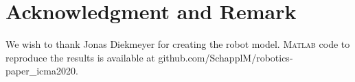 
\section*{Acknowledgment and Remark}


We wish to thank Jonas Diekmeyer for creating the robot model.
%
\textsc{Matlab} code to reproduce the results is available at  
%
github.com/SchapplM/robotics-paper\_icma2020.

